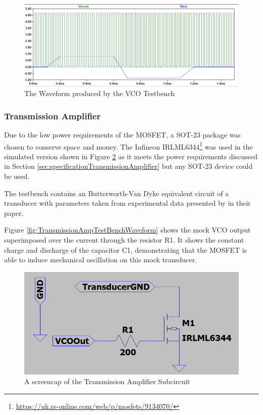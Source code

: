 \begin{figure}[H]
    \centering 
    \includegraphics[width=\textwidth]{../Circuits/Images/VCO/TestBenchWaveform}
    \caption{The Waveform produced by the VCO Testbench}
    \label{fig:VCOTestBenchWaveform}
\end{figure}

\subsubsection{Transmission Amplifier}
Due to the low power requirements of the MOSFET, a SOT-23 package was chosen to conserve space and money. 
The Infineon IRLML6344\footnote{\url{https://uk.rs-online.com/web/p/mosfets/9134070/}} was used in the simulated version shown in Figure \ref{fig:TransmissionAmpSchematic} as it meets the power requirements discussed in Section \ref{sec:specificationTransmissionAmplifier} but any SOT-23 device could be used.

The testbench contains an Butterworth-Van Dyke equivalent circuit of a transducer with parameters taken from experimental data presented by \citeauthor{equivalentCircuit} in their \citeyear{equivalentCircuit} paper\cite{equivalentCircuit}.

Figure \ref{fig:TransmissionAmpTestBenchWaveform} shows the mock VCO output superimposed over the current through the resistor R1.
It shows the constant charge and discharge of the capacitor C1, demonstrating that the MOSFET is able to induce mechanical oscillation on this mock transducer.

\begin{figure}[H]
    \centering 
    \includegraphics[width=\textwidth]{../Circuits/Images/TransmissionAmp/Schematic}
    \caption{A screencap of the Transmission Amplifier Subcircuit}
    \label{fig:TransmissionAmpSchematic}
\end{figure}

